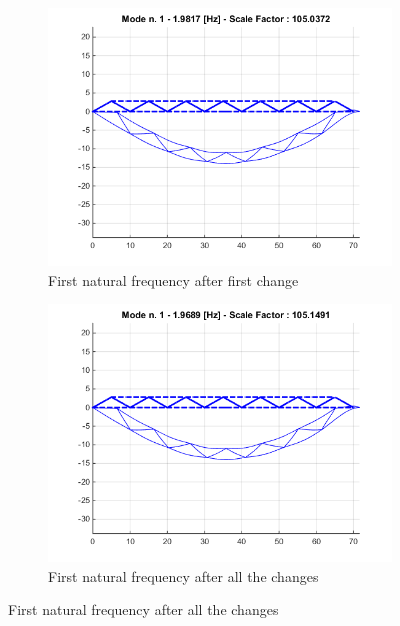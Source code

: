 \documentclass[10pt,a4paper,final]{report}
\begin{document}
\begin{figure}[h]
        \centering
        \begin{subfigure}[t]{0.5\textwidth}
                \includegraphics[width=\textwidth]{bridgelast1}
                \caption{First natural frequency after first change}
                \label{fig:last3}
        \end{subfigure}%
        \begin{subfigure}[t]{0.5\textwidth}
                \includegraphics[width=\textwidth]{bridgelast2}
                \caption{First natural frequency after all the changes}
                \label{fig:last4}
        \end{subfigure}
         \label{fig:lastb}
\end{figure}
\newpage
\end{document}
